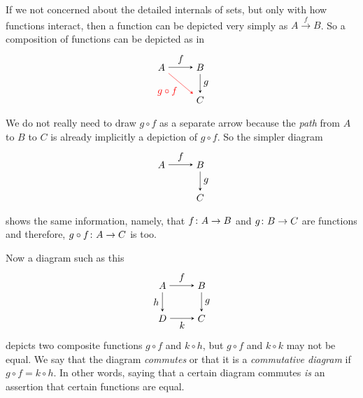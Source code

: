 If we not concerned about the detailed internals of sets, but only with how functions interact, then a function can be depicted very simply as $A\stackrel{f}{\longrightarrow} B$.
So a composition of functions can be depicted as in
\[
\tikzset{>=stealth}
\begin{tikzpicture}[every node/.style={midway}]
\matrix[column sep={4em,between origins},
        row sep={2em}] at (0,0)
{ \node(A)   {$A$}  ; & \node(B) {$B$}; \\
                      & \node(C) {$C$}; \\};
\draw[->] (A) -- (B) node[anchor=south]  {$f$};
\draw[->] (B) -- (C) node[anchor=west]  {$g$};
\draw[->,red] (A) -- (C) node[anchor=north east] {$g\circ f$};
\end{tikzpicture}
\]
We do not really need to draw $g\circ f$ as a separate arrow because the \emph{path} from $A$ to $B$ to $C$ is already implicitly a depiction of $g\circ f$.
So the simpler diagram 
\[
\tikzset{>=stealth}
\begin{tikzpicture}[every node/.style={midway}]
\matrix[column sep={4em,between origins},
        row sep={2em}] at (0,0)
{ \node(A)   {$A$}  ; & \node(B) {$B$}; \\
                      & \node(C) {$C$}; \\};
\draw[->] (A) -- (B) node[anchor=south]  {$f$};
\draw[->] (B) -- (C) node[anchor=west]  {$g$};
\end{tikzpicture}
\]
shows the same information, namely, that ${f}\colon{A}\to{B}$ and ${g}\colon{B}\to{C}$ are functions and therefore, ${g\circ f}\colon{A}\to{C}$ is too.

Now a diagram such as this
\[
\tikzset{>=stealth}
\begin{tikzpicture}[every node/.style={midway}]
\matrix[column sep={4em,between origins},
        row sep={2em}] at (0,0)
{ \node(A)   {$A$}  ; & \node(B) {$B$}; \\
  \node(D)   {$D$}  ; & \node(C) {$C$}; \\};
\draw[->] (A) -- (B) node[anchor=south]  {$f$};
\draw[->] (B) -- (C) node[anchor=west]  {$g$};
\draw[->] (A) -- (D) node[anchor=east] {$h$};
\draw[->] (D) -- (C) node[anchor=north] {$k$};
\end{tikzpicture}
\]
depicts two composite functions $g\circ f$ and $k\circ h$, but $g\circ f$ and $k\circ k$ may not be equal.
We say that the diagram \emph{commutes} or that it is a \emph{commutative diagram} if $g\circ f = k\circ h$.
In other words, saying that a certain diagram commutes \emph{is} an assertion that certain functions are equal.



